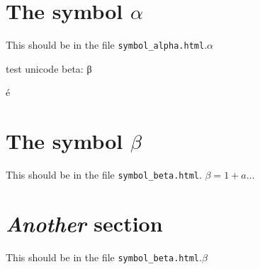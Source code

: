 \documentclass{article}
\begin{document}
\section{The symbol $\alpha$}

This should be in the file \texttt{symbol\_alpha.html}.$\alpha$

test unicode beta: β

\'e

\section{The symbol $\beta$}

This should be in the file \texttt{symbol\_beta.html}. $\beta = 1 + a \ldots$

\section{\textit{Another} section}

This should be in the file \texttt{symbol\_beta.html}.$\beta$
\end{document}
